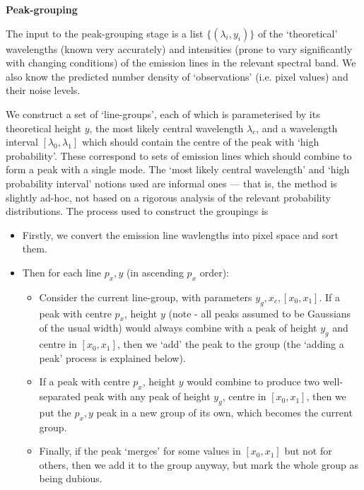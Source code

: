 \vspace{1em}

{\bf{Peak-grouping}}

\vspace{1em}

The input to the peak-grouping stage is a list $\{(\lambda_i, y_i)\}$ of
the `theoretical' wavelengths (known very accurately) and intensities
(prone to vary significantly with changing conditions) of the emission
lines in the relevant spectral band. We also know the predicted number
density of `observations' (i.e. pixel values) and their noise levels.

We construct a set of `line-groups', each of which is parameterised
by its theoretical height $y$, the most likely central wavelength
$\lambda_c$, and a wavelength interval $[\lambda_0, \lambda_1]$ which
should contain the centre of the peak with `high probability'. These
correspond to sets of emission lines which should combine to form a
peak with a single mode. The `most likely central wavelength' and `high
probability interval' notions used are informal ones --- that is, the
method is slightly ad-hoc, not based on a rigorous analysis of the
relevant probability distributions. The process used to construct the
groupings is
%
\begin{itemize}
\item Firstly, we convert the emission line wavlengths into pixel space
and sort them.
\item Then for each line $p_x, y$ (in ascending $p_x$ order):
\begin{itemize}
\item Consider the current line-group, with parameters $y_g, x_c, [x_0,
x_1]$. If a peak with centre $p_x$, height $y$ (note - all peaks assumed
to be Gaussians of the usual width) would always combine with a peak of height
$y_g$ and centre in $[x_0, x_1]$, then we `add' the peak to the group
(the `adding a peak' process is explained below). 
\item If a peak with centre $p_x$, height $y$ would combine to produce
two well-separated peak with any peak of height $y_g$, centre in $[x_0,
x_1]$, then we put the $p_x, y$ peak in a new group of its own, which
becomes the current group.
\item Finally, if the peak `merges' for some values in $[x_0, x_1]$ but not for
others, then we add it to the group anyway, but mark the whole group as being
dubious.
\end{itemize}
\end{itemize} 

